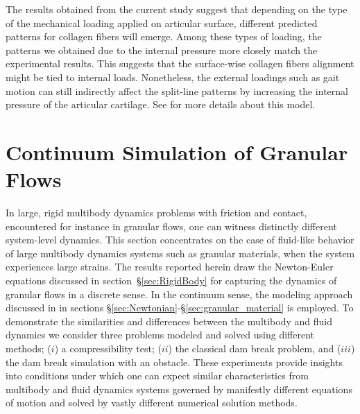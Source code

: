 The results obtained from the current study suggest that depending on the type of the mechanical loading applied on articular surface, different predicted patterns for collagen fibers will emerge. Among these types of loading, the patterns we obtained due to the internal pressure more closely match the experimental results. This suggests that the surface-wise collagen fibers alignment might be tied to internal loads. Nonetheless, the external loadings such as gait motion can still indirectly affect the split-line patterns by increasing the internal pressure of the articular cartilage. See \cite{rakhsha2019simulation} for more details about this model.

\section{Continuum Simulation of Granular Flows}

In large, rigid multibody dynamics problems with friction and contact, encountered for instance in granular flows, one can witness distinctly different system-level dynamics. This section concentrates on the case of fluid-like behavior of large multibody dynamics systems such as granular materials, when the system experiences large strains. The results reported herein draw the Newton-Euler equations discussed in section~\S\ref{sec:RigidBody} for capturing the dynamics of granular flows in a discrete sense. In the continuum sense, the modeling approach discussed in in sections \S\ref{sec:Newtonian}-\S\ref{sec:granular_material} is employed. To demonstrate the similarities and differences between the multibody and fluid dynamics we consider three problems modeled and solved using different methods; ($i$) a compressibility test; ($ii$) the classical dam break problem, and ($iii$) the dam break simulation with an obstacle. These experiments provide insights into conditions under which one can expect similar characteristics from multibody and fluid dynamics systems governed by manifestly different equations of motion and solved by vastly different numerical solution methods. 

